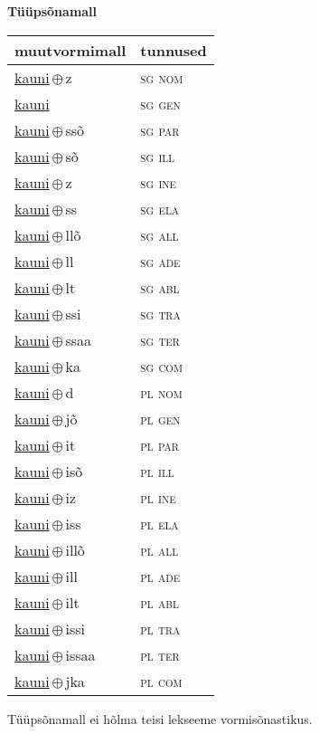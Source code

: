

\vspace{3.5em}
\noindent \begin{minipage}{\textwidth}
\noindent \textbf{Tüüpsõnamall \,}\\

\begin{sideways}
\begin{tabular}{l l}
muutvormimall & tunnused \\
\hline
\underline{kauni}\,$\oplus$\,z & \textsc{ sg nom } \\
\underline{kauni} & \textsc{ sg gen } \\
\underline{kauni}\,$\oplus$\,ssõ & \textsc{ sg par } \\
\underline{kauni}\,$\oplus$\,sõ & \textsc{ sg ill } \\
\underline{kauni}\,$\oplus$\,z & \textsc{ sg ine } \\
\underline{kauni}\,$\oplus$\,ss & \textsc{ sg ela } \\
\underline{kauni}\,$\oplus$\,llõ & \textsc{ sg all } \\
\underline{kauni}\,$\oplus$\,ll & \textsc{ sg ade } \\
\underline{kauni}\,$\oplus$\,lt & \textsc{ sg abl } \\
\underline{kauni}\,$\oplus$\,ssi & \textsc{ sg tra } \\
\underline{kauni}\,$\oplus$\,ssaa & \textsc{ sg ter } \\
\underline{kauni}\,$\oplus$\,ka & \textsc{ sg com } \\
\underline{kauni}\,$\oplus$\,d & \textsc{ pl nom } \\
\underline{kauni}\,$\oplus$\,jõ & \textsc{ pl gen } \\
\underline{kauni}\,$\oplus$\,it & \textsc{ pl par } \\
\underline{kauni}\,$\oplus$\,isõ & \textsc{ pl ill } \\
\underline{kauni}\,$\oplus$\,iz & \textsc{ pl ine } \\
\underline{kauni}\,$\oplus$\,iss & \textsc{ pl ela } \\
\underline{kauni}\,$\oplus$\,illõ & \textsc{ pl all } \\
\underline{kauni}\,$\oplus$\,ill & \textsc{ pl ade } \\
\underline{kauni}\,$\oplus$\,ilt & \textsc{ pl abl } \\
\underline{kauni}\,$\oplus$\,issi & \textsc{ pl tra } \\
\underline{kauni}\,$\oplus$\,issaa & \textsc{ pl ter } \\
\underline{kauni}\,$\oplus$\,jka & \textsc{ pl com } \\
\end{tabular}
\end{sideways}
\label{tab:tüüpsõnamall-kauniz}

\end{minipage}

 
\vspace{1em}
\noindent Tüüpsõnamall  ei hõlma teisi lekseeme vormi\-sõnastikus.
